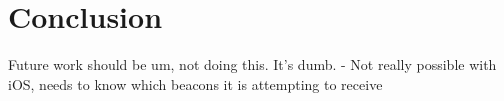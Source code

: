 \documentclass[conference]{IEEEtran} %
\begin{document}
\section{Conclusion}
Future work should be um, not doing this. It's dumb.
- Not really possible with iOS, needs to know which beacons it is attempting to receive




\end{document}
